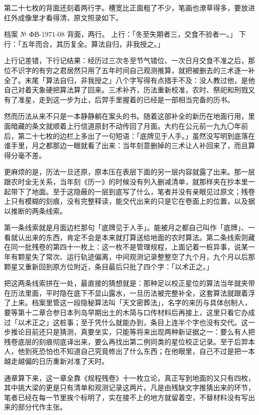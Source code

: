 第二十七枚的背面还刻着两行字。槽宽比正面粗了不少，笔画也潦草得多，要放进红外成像里才看得清，原文照录如下。

\begin{archive}[内部参考]{档案 № ФВ-1971-08}
背面，两行。
上行：「冬至失期者三，交食不验者一。」
下行：「五年而合，其历复全。算法自归，非我授之。」
\end{archive}

上行记差错，下行记结果：经历过三次冬至节气错位、一次日月交食不准之后，那位不识字的有穷之君居然只用了五年时间自己观测推算，就把被删去的三术逐一补全了。末尾「算法自归，非我授之」八个字写得有点措手不及：没人教过他，是他自己对着天象硬把算法算了回来。三术补齐，历法重新校准，农时、祭祀和刑戮又有了准星，走到这一步为止，后羿手里握着的已经是一部相当完备的历书。

然而历法从来不只是一本静静躺在案头的书。随着这部补全的新历在地面行用，里面暗藏的条文就顺着上行信道原封不动传回了月面。大约在公元前一九九〇年前后，第二十七枚的边栏上多出了一句短语：「底牌见于人手。」虽然没写明到底落在谁手里，月之都那边一眼就看了出来：当年刻意删掉的三术让人补回来了，而且算得分毫不差。

更麻烦的是，历法一旦还原，原本压在表层下面的另一层内容就露了出来。那一层跟农时全无关系，当年刻《历一》的时候没有列入删减清单，就那样夹在抄本里一起带下了地面。至于这隐蔽的一层到底写了什么，笔者并没有亲眼见过原文；残卷上只有模糊的刻痕，没有完整释读，能交代出来的只是它在卷面上的位置，以及据以推断的两条线索。

第一条线索就是月面边栏那句「底牌见于人手」。能被月之都自己叫作「底牌」、一看就认出来的东西，肯定不会是本来就打算送给地面的农时算法。第二条线索则藏在同一批残卷的第四十一枚上：这一枚不是管理规程，上面记着一桩异事，说某一年有颗星失了常次、运行轨迹偏离，中间观测记录整整空了九个月，九个月以后那颗星又重新回到原方位附近，条目最后只批了四个字：「以术正之。」

把这两条线索拼在一处，最直接的猜想就是：那种足以校正星位的算法当年就夹带在历法里面，平时隐在底下不显山露水，一旦历法被完整补全，这套算法就跟着浮了上来。档案里管这一段隐秘算法叫「天文密葬法」，名字的来历与具体创制人，要等第十二章合参日本列岛早期出土的木简与口传材料后再接上，这里只看它办成过「以术正之」这桩事；至于凭什么就能办到，条目上连半个字也没有交代。这一步推论目前还只是猜测，真要坐实，只能等将来出现两种新证据之一：要么有人把残卷底层的刻痕彻底译出来，要么再找出第二例同类的星位校正记录。至于后羿本人，他到死恐怕也不知道自己究竟修出了什么东西；在他眼里，自己不过是把一本越走越偏的日历重新对准了天时。

通章算下来，这一章全靠《规程残卷》十一枚立论，真正写到地面的又只有四枚，其中挑大梁的更是只有清单和观测记录这两片。凡是由残缺文字推猜出来的环节，笔者已经在每一节里挨个标明了，实在接不上的地方就留着空，不替材料没有写出来的部分代作主张。
